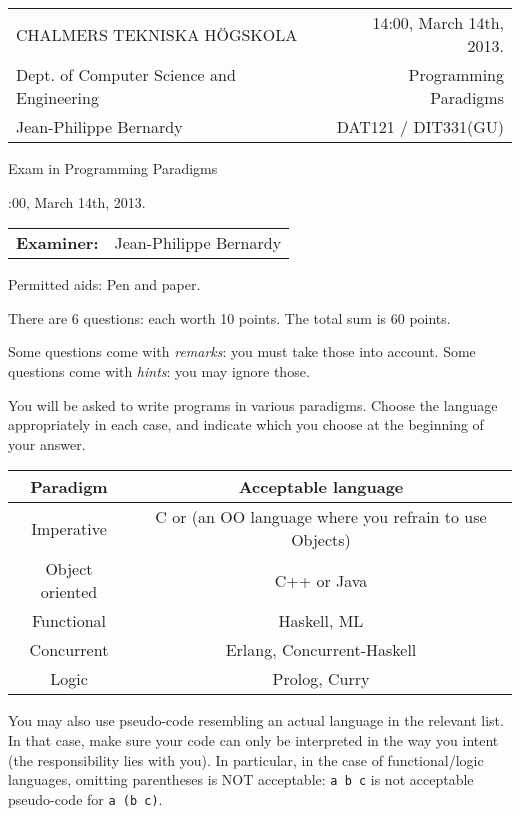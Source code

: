 \documentclass{article}
\begin{document}
\setlength{\parskip}{2pt}

\newcommand{\examtime}{14:00, March 14th, 2013}
\newcommand{\points}[1]{\marginpar{\bf #1 points}}
\noindent
\begin{tabular}{lr}
CHALMERS TEKNISKA H\"OGSKOLA &\examtime{}.\\
Dept. of Computer Science and Engineering & Programming Paradigms\\
Jean-Philippe Bernardy                 & DAT121 / DIT331(GU) \\
\end{tabular}

\vspace{2.5cm} \noindent
\begin{center} {\LARGE
Exam in Programming Paradigms}
\end{center}

\vspace{1.5cm}

\noindent
\examtime{}.\\
\begin{tabular}{ll}
\textbf{Examiner:} & Jean-Philippe Bernardy
\end{tabular}
\vspace{1cm}

\noindent
Permitted aids: Pen and paper.

There are 6 questions: each worth 10 points. The total sum is 60
points.

Some questions come with \emph{remarks}: you must take those
into account.  Some questions come with \emph{hints}: you may ignore
those.

You will be asked to write programs in various paradigms. Choose the
language appropriately in each case, and indicate which you choose at
the beginning of your answer.

\begin{tabular}[p]{cc}
  Paradigm & Acceptable language \\ \hline
  Imperative   & C or (an OO language where you refrain to use Objects) \\
  Object oriented & C++ or Java \\
  Functional & Haskell, ML \\
  Concurrent & Erlang, Concurrent-Haskell \\
  Logic & Prolog, Curry
\end{tabular}

You may also use pseudo-code resembling an actual language in the
relevant list. In that case, make sure your code can only be
interpreted in the way you intent (the responsibility lies with
you). In particular, in the case of functional/logic languages,
omitting parentheses is NOT acceptable: \texttt{a b c} is not
acceptable pseudo-code for \texttt{a (b c)}.
\end{document}
